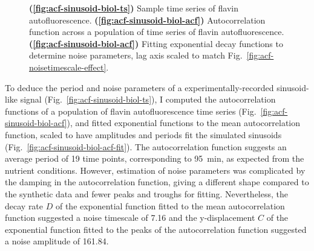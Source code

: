 \begin{figure}
  \caption{
    \textbf{(\ref{fig:acf-sinusoid-biol-ts})}
    Sample time series of flavin autofluorescence.
    \textbf{(\ref{fig:acf-sinusoid-biol-acf})}
    Autocorrelation function across a population of time series of flavin autofluorescence.
    \textbf{(\ref{fig:acf-sinusoid-biol-acf})}
    Fitting exponential decay functions to determine noise parameters, lag axis scaled to match Fig.\ \ref{fig:acf-noisetimescale-effect}.
  }
  \label{fig:acf-sinusoid-biol}
\end{figure}

To deduce the period and noise parameters of a experimentally-recorded sinusoid-like signal (Fig.\ \ref{fig:acf-sinusoid-biol-ts}), I computed the autocorrelation functions of a population of flavin autofluorescence time series (Fig.\ \ref{fig:acf-sinusoid-biol-acf}), and fitted exponential functions to the mean autocorrelation function, scaled to have amplitudes and periods fit the simulated sinusoids (Fig.\ \ref{fig:acf-sinusoid-biol-acf-fit}).
The autocorrelation function suggests an average period of 19 time points, corresponding to \SI{95}{\minute}, as expected from the nutrient conditions.
However, estimation of noise parameters was complicated by the damping in the autocorrelation function, giving a different shape compared to the synthetic data and fewer peaks and troughs for fitting.
Nevertheless, the decay rate $D$ of the exponential function fitted to the mean autocorrelation function suggested a noise timescale of 7.16 and the y-displacement $C$ of the exponential function fitted to the peaks of the autocorrelation function suggested a noise amplitude of 161.84.


